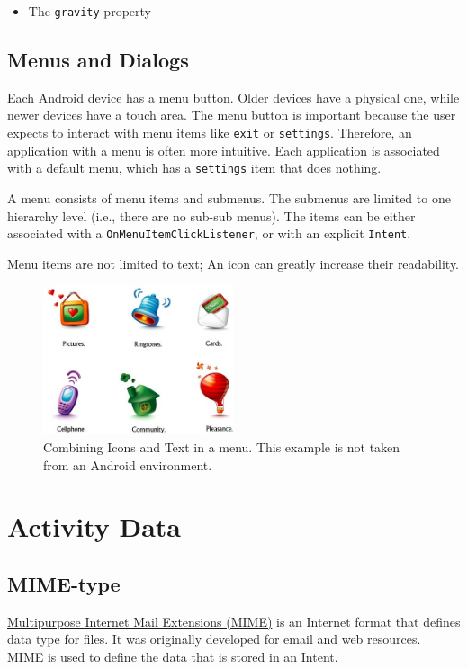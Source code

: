 \documentclass{article}
\begin{document}
\begin{itemize}
\item The \texttt{gravity} property
\end{itemize}

\subsection{Menus and Dialogs}

Each Android device has a menu button. Older devices have a physical one, while newer devices have a touch area. The menu button is important because the user expects to interact with menu items like \texttt{exit} or  \texttt{settings}. Therefore, an application with a menu is often more intuitive. Each application is associated with a default menu, which has a \texttt{settings} item that does nothing.

A menu consists of menu items and submenus. The submenus are limited to one hierarchy level (i.e., there are no sub-sub menus). The items can be either associated with a \texttt{OnMenuItemClickListener}, or with an explicit \texttt{Intent}.

Menu items are not limited to text;  An icon can greatly increase their readability.

\begin{figure}[h!]
  \centering
      \includegraphics[width=0.5\textwidth]{img/icons.jpeg}
  \caption{Combining Icons and Text in a menu. This example is not taken from an Android environment.}
\end{figure}

\section{Activity Data}
\subsection{MIME-type}
\href{http://en.wikipedia.org/wiki/MIME}{Multipurpose Internet Mail Extensions (MIME)} is an Internet format that defines data type for files. It was originally developed for email and web resources. MIME is used to define the data that is stored in an Intent.
\end{document}
